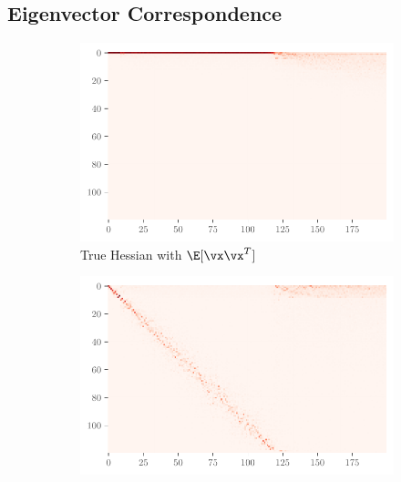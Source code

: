 \subsection{Eigenvector Correspondence}
\label{sec:eigen_corr}
\begin{figure}[ht]
    \centering
    \begin{subfigure}[t]{0.46\textwidth}
        \centering
        \captionsetup{justification=centering}
        \includegraphics[width=\textwidth]{Figures/Correspondence/LeNet5_fixlr0.01/xxT_Trueest_real_corr_expand_t200_CIFAR10_Exp1_LeNet5_fixlr0.01R2_E-1_fc1.pdf}
        \caption{True Hessian with $\E[\vx\vx^T]$}
        \label{fig:Corr_xxT_True_fc}
    \end{subfigure}%
    \begin{subfigure}[t]{0.46\textwidth}
        \centering
        \captionsetup{justification=centering}
        \includegraphics[width=\textwidth]{Figures/Correspondence/LeNet5_fixlr0.01/UTAU_Trueest_real_corr_expand_t200_CIFAR10_Exp1_LeNet5_fixlr0.01R2_E-1_fc1.pdf}

\end{subfigure}
\end{figure}
